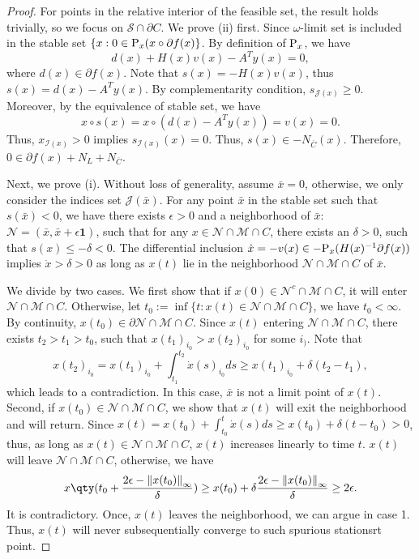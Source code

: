 \documentclass[11pt]{article}
\newcommand{\cI}{\mathcal I}
\newcommand{\cJ}{\mathcal J}
\newcommand{\cM}{\mathcal M}
\newcommand{\cN}{\mathcal N}
\def\norm#1{\left\|#1\right\|}
\begin{document}
\begin{proof}
For points in the relative interior of the feasible set, the result holds trivially, so we focus on $\mathcal{S} \cap \partial C$. We prove (ii) first. Since $\omega$-limit set is included in the stable set $\{x:0\in {\rm P}_x(x\circ\partial f(x)\}$. By definition of ${\rm P}_x$, we have 
\[
d(x)+H(x)v(x)-A^Ty(x)=0,
\]
where $d(x)\in\partial f(x)$. Note that $s(x)=-H(x)v(x)$, thus $s(x)=d(x)-A^Ty(x)$. By complementarity condition, $s_{\cJ(x)}\geq0$. Moreover, by the equivalence of stable set, we have 
\[
x\circ s(x)=x\circ(d(x)-A^Ty(x))=v(x)=0.
\]
Thus, $x_{\cI(x)}>0$ implies $s_{\cI(x)}(x)=0$. Thus, $s(x)\in-N_{\overline{C}}(x)$. Therefore, $0\in\partial f(x)+N_L+N_{\overline{C}}$. 

Next, we prove (i). Without loss of generality, assume $\bar x=0$, otherwise, we only consider the indices set $\cJ(\bar x)$. For any point $\bar x$ in the stable set such that $s(\bar x)<0$, we have there exists $\epsilon>0$ and a neighborhood of $\bar x$: $\cN=(\bar x,\bar x+\epsilon\mathbf{1})$, such that for any $x\in\cN\cap\cM\cap C$, there exists an $\delta>0$, such that $s(x)\leq-\delta<0$. The differential inclusion $\dot{x}=-v(x)\in-{\rm P}_x(H(x)^{-1}\partial f(x))$ implies $\dot x>\delta>0$ as long as $x(t)$ lie in the neighborhood $\cN\cap\cM\cap C$ of $\bar x$. 

We divide by two cases. We first show that if $x(0)\in\cN^c\cap\cM\cap C$, it will enter $\cN\cap\cM\cap C$. Otherwise,  let $t_0:=\inf\{t:x(t)\in\cN\cap\cM\cap C\}$, we have $t_0<\infty$. By continuity, $x(t_0)\in\partial\cN\cap\cM\cap C$. Since $x(t)$ entering $\cN\cap\cM\cap C$, there exists $t_2>t_1>t_0$, such that $x(t_1)_{i_0}>x(t_2)_{i_0}$ for some $i_)$. Note that 
\[x(t_2)_{i_0}=x(t_1)_{i_0}+\int_{t_1}^{t_2}\dot x(s)_{i_0}ds\geq x(t_1)_{i_0}+\delta(t_2-t_1),
\] 
which leads to a contradiction. In this case, $\bar x$ is not a limit point of $x(t)$. Second, if $x(t_0)\in\cN\cap\cM\cap C$, we show that $x(t)$ will exit the neighborhood and will return. Since $x(t)=x(t_0)+\int_{t_0}^t\dot x(s) ds\geq x(t_0)+\delta(t-t_0)>0$, thus, as long as $x(t)\in\cN\cap\cM\cap C$, $x(t)$ increases linearly to time $t$. $x(t)$ will leave $\cN\cap\cM\cap C$, otherwise, we have 
\[
x\qty(t_0+\frac{2\epsilon-\norm{x(t_0)}_\infty}{\delta})\geq x(t_0)+\delta\frac{2\epsilon-\norm{x(t_0)}_\infty}{\delta}\geq2\epsilon.
\]
It is contradictory. Once, $x(t)$ leaves the neighborhood, we can argue in case 1. Thus, $x(t)$ will never subsequentially converge to such spurious stationsrt point.
\end{proof}
\end{document}

